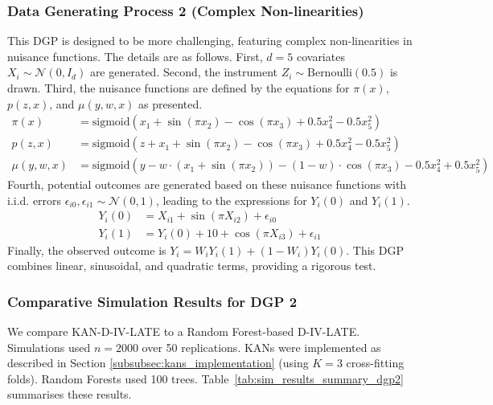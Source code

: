 \documentclass[final,3p,fleqn, 10pt]{elsarticle}
\begin{document}
\subsubsection{Data Generating Process 2 (Complex Non-linearities)}
This DGP is designed to be more challenging, featuring complex non-linearities in nuisance functions. The details are as follows.
First, $d=5$ covariates $X_i \sim \mathcal{N}(0, I_d)$ are generated. Second, the instrument $Z_i \sim \text{Bernoulli}(0.5)$ is drawn. Third, the nuisance functions are defined by the equations for $\pi(x)$, $p(z, x)$, and $\mu(y, w, x)$ as presented.
        \begin{align*}
        \pi(x) &= \text{sigmoid}(x_1 + \sin(\pi x_2) - \cos(\pi x_3) + 0.5x_4^2 - 0.5x_5^2) \\
        p(z, x) &= \text{sigmoid}(z + x_1 + \sin(\pi x_2) - \cos(\pi x_3) + 0.5x_4^2 - 0.5x_5^2) \\
        \mu(y, w, x) &= \text{sigmoid}(y - w \cdot (x_1 + \sin(\pi x_2)) - (1-w) \cdot \cos(\pi x_3) - 0.5x_4^2 + 0.5x_5^2)
        \end{align*}
Fourth, potential outcomes are generated based on these nuisance functions with i.i.d. errors $\epsilon_{i0}, \epsilon_{i1} \sim \mathcal{N}(0,1)$, leading to the expressions for $Y_i(0)$ and $Y_i(1)$.
        \begin{align*}
        Y_i(0) &= X_{i1} + \sin(\pi X_{i2}) + \epsilon_{i0} \\
        Y_i(1) &= Y_i(0) + 10 + \cos(\pi X_{i3}) + \epsilon_{i1}
        \end{align*}
Finally, the observed outcome is $Y_i = W_i Y_i(1) + (1-W_i) Y_i(0)$.
This DGP combines linear, sinusoidal, and quadratic terms, providing a rigorous test.

\subsubsection{Comparative Simulation Results for DGP 2}
We compare KAN-D-IV-LATE to a Random Forest-based D-IV-LATE. Simulations used $n=2000$ over 50 replications. KANs were implemented as described in Section \ref{subsubsec:kans_implementation} (using $K=3$ cross-fitting folds). Random Forests used 100 trees. Table~\ref{tab:sim_results_summary_dgp2} summarises these results.
\end{document}

